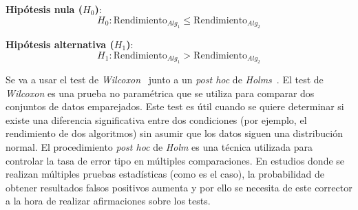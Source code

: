 \textbf{Hipótesis nula (\(H_0\))}:
\begin{equation}
    H_0: \text{Rendimiento}_{Alg_1} \leq \text{Rendimiento}_{Alg_2}
\end{equation}

\textbf{Hipótesis alternativa (\(H_1\))}:
\begin{equation}
    H_1: \text{Rendimiento}_{Alg_1} > \text{Rendimiento}_{Alg_2}
\end{equation}

Se va a usar el test de \textit{Wilcoxon}~\cite{Rey2011} junto a un \textit{post hoc} de \textit{Holms}~\cite{holm1979simple}. El test de \textit{Wilcoxon} es una prueba no paramétrica que se utiliza para comparar dos conjuntos de datos emparejados. Este test es útil cuando se quiere determinar si existe una diferencia significativa entre dos condiciones (por ejemplo, el rendimiento de dos algoritmos) sin asumir que los datos siguen una distribución normal. El procedimiento \textit{post hoc} de \textit{Holm} es una técnica utilizada para controlar la tasa de error tipo en múltiples comparaciones. En estudios donde se realizan múltiples pruebas estadísticas (como es el caso), la probabilidad de obtener resultados falsos positivos aumenta y por ello se necesita de este corrector a la hora de realizar afirmaciones sobre los tests.